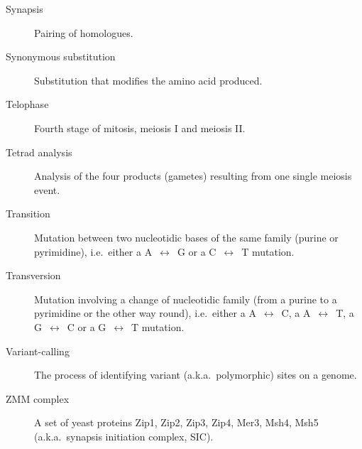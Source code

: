 \begin{alwayssingle}
\begin{description}
		\item[Synapsis] Pairing of homologues.
		\item[Synonymous substitution] Substitution that modifies the amino acid produced.
		\item[Telophase] Fourth stage of mitosis, meiosis I and meiosis II\@.
		\item[Tetrad analysis] Analysis of the four products (gametes) resulting from one single meiosis event.
		\item[Transition] Mutation between two nucleotidic bases of the same family (purine or pyrimidine), i.e.\ either a A~$\leftrightarrow$~G or a C~$\leftrightarrow$~T mutation.
		\item[Transversion] Mutation involving a change of nucleotidic family (from a purine to a pyrimidine or the other way round), i.e.\ either a A~$\leftrightarrow$~C, a A~$\leftrightarrow$~T, a G~$\leftrightarrow$~C or a G~$\leftrightarrow$~T mutation.
		\item[Variant-calling] The process of identifying variant (a.k.a.\ polymorphic) sites on a genome.
		\item[ZMM complex] A set of  yeast proteins Zip1, Zip2, Zip3, Zip4, Mer3, Msh4, Msh5  (a.k.a.\ synapsis initiation complex, SIC).








	\end{description}
\end{alwayssingle}
\mtcaddchapter{}


